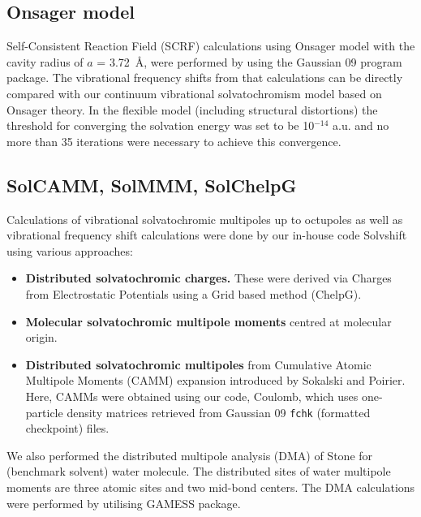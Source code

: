 \documentclass[a4paper,titlepage,twoside,fleqn,12pt]{book}
\begin{document}
\begin{appendices}
\begin{refsection}
\subsection{Onsager model}

Self\hyp{}Consistent Reaction Field (SCRF) calculations
using Onsager model \citep{Kirkwood.JCP.1934,Onsager.JACS.1936,
Wong.Frisch.Wiberg.JACS.1991,Wong.Wiberg.Frisch.JCP.1991,
Wong.Wiberg.Frisch.JACS.1992}
%
with the cavity radius of
$a$ = 3.72~\AA, were performed by using the {\sc Gaussian 09} program package. \citep{Frisch.Gaussian.2009}
The vibrational frequency shifts from that calculations can be directly
compared with our continuum vibrational solvatochromism model
based on Onsager theory. In the flexible model (including structural
distortions) the threshold for converging the solvation energy
was set to be 10$^{-14}$ a.u. and no more than 35 iterations were necessary
to achieve this convergence.


\subsection{SolCAMM, SolMMM, SolChelpG}

Calculations
of vibrational solvatochromic multipoles up to octupoles as
well as vibrational frequency shift calculations were done by
our in\hyp{}house code {\sc Solvshift} using various approaches:
%
\begin{itemize}
\item {\bf Distributed solvatochromic charges.} These were derived
via Charges from Electrostatic Potentials using a Grid
based method (ChelpG). \citep{Breneman.Wiberg.JCC.1990}
\item {\bf Molecular solvatochromic multipole moments}
centred at molecular origin. \citep{Lee.Choi.Cho.JCP.2012}
\item {\bf Distributed solvatochromic multipoles} from Cumulative
Atomic Multipole Moments (CAMM) expansion introduced
by Sokalski and Poirier. \citep{Sokalski.Poirier.CPL.1983}
Here, CAMMs were obtained using our code,
{\sc Coulomb}, which uses one\hyp{}particle density matrices retrieved
from {\sc Gaussian 09} \verb+fchk+ (formatted checkpoint)
files. 
\end{itemize}
%
We also performed the
distributed multipole analysis (DMA) of Stone \citep{Sokalski.Poirier.CPL.1983} 
for (benchmark
solvent) water molecule. The distributed sites of water
multipole moments are three atomic sites and two mid\hyp{}bond
centers. The DMA calculations were performed by utilising
GAMESS package. \citep{GAMESS.JCC.1993}


\end{refsection}
\end{appendices}
\end{document}

